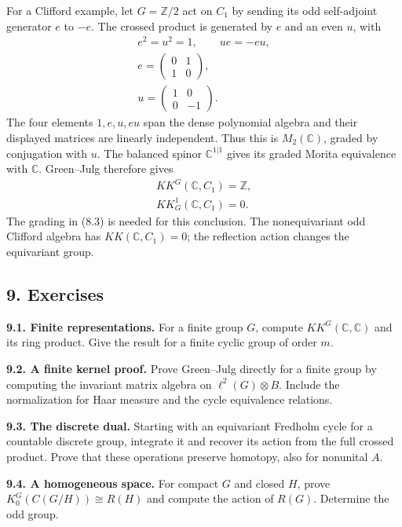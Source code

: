 \documentclass[
  11pt,
]{article}
\begin{document}
For a Clifford example, let \(G=\mathbb Z/2\) act on \(C_1\) by sending
its odd self-adjoint generator \(e\) to \(-e\). The crossed product is
generated by \(e\) and an even \(u\), with \[
\begin{gathered}
e^2=u^2=1,\qquad ue=-eu,\\
e=\begin{pmatrix}0&1\\1&0\end{pmatrix},\\
u=\begin{pmatrix}1&0\\0&-1\end{pmatrix}.
\end{gathered}
\tag{8.3}
\] The four elements \(1,e,u,eu\) span the dense polynomial algebra and
their displayed matrices are linearly independent. Thus this is
\(M_2(\mathbb C)\), graded by conjugation with \(u\). The balanced
spinor \(\mathbb C^{1|1}\) gives its graded Morita equivalence with
\(\mathbb C\). Green--Julg therefore gives \[
\begin{gathered}
KK^G(\mathbb C,C_1)=\mathbb Z,\\
KK_G^1(\mathbb C,C_1)=0.
\end{gathered}
\tag{8.4}
\] The grading in (8.3) is needed for this conclusion. The
nonequivariant odd Clifford algebra has \(KK(\mathbb C,C_1)=0\); the
reflection action changes the equivariant group.

\subsection{9. Exercises}\label{exercises}

\textbf{9.1. Finite representations.} For a finite group \(G\), compute
\(KK^G(\mathbb C,\mathbb C)\) and its ring product. Give the result for
a finite cyclic group of order \(m\).

\textbf{9.2. A finite kernel proof.} Prove Green--Julg directly for a
finite group by computing the invariant matrix algebra on
\(\ell^2(G)\otimes B\). Include the normalization for Haar measure and
the cycle equivalence relations.

\textbf{9.3. The discrete dual.} Starting with an equivariant Fredholm
cycle for a countable discrete group, integrate it and recover its
action from the full crossed product. Prove that these operations
preserve homotopy, also for nonunital \(A\).

\textbf{9.4. A homogeneous space.} For compact \(G\) and closed \(H\),
prove \(K_0^G(C(G/H))\cong R(H)\) and compute the action of \(R(G)\).
Determine the odd group.
\end{document}
